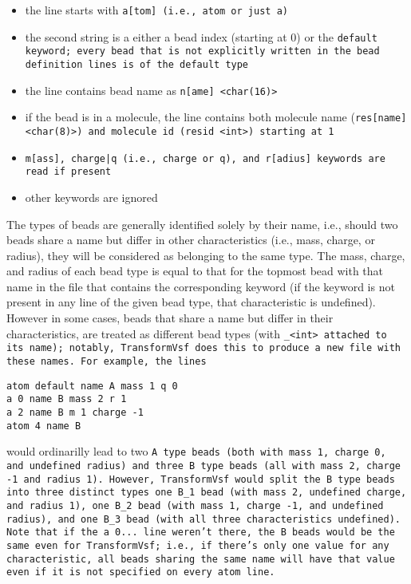 \begin{itemize}[topsep=0pt,itemsep=0pt]
  \item the line starts with \tt{a[tom]} (i.e., \tt{atom} or just \tt{a})
  \item the second string is a either a bead index (starting at 0) or the
    \tt{default} keyword; every bead that is not explicitly written in the
    bead definition lines is of the \tt{default} type
  \item the line contains bead name as \tt{n[ame] <char(16)>}
  \item if the bead is in a molecule, the line contains both molecule name
    (\tt{res[name] <char(8)>}) and molecule id (\tt{resid <int>}) starting
    at 1
  \item \tt{m[ass]}, \tt{charge|q} (i.e., \tt{charge} or \tt{q}), and
    \tt{r[adius]} keywords are read if present
  \item other keywords are ignored
\end{itemize}

The types of beads are generally identified solely by their name, i.e.,
should two beads share a name but differ in other characteristics (i.e.,
mass, charge, or radius), they will be considered as belonging to the same
type. The mass, charge, and radius of each bead type is equal to that for
the topmost bead with that name in the \vsf file that contains the
corresponding keyword (if the keyword is not present in any line of the
given bead type, that characteristic is undefined). However in some cases,
beads that share a name but differ in their characteristics, are treated as
different bead types (with \tt{\_<int>} attached to its name); notably,
\tt{TransformVsf} does this to produce a new \vsf file with these names.
For example, the lines
\begin{verbatim}
atom default name A mass 1 q 0
a 0 name B mass 2 r 1
a 2 name B m 1 charge -1
atom 4 name B
\end{verbatim}
would ordinarilly lead to two \tt{A} type beads (both with mass 1, charge
0, and undefined radius) and three \tt{B} type beads (all with mass 2,
charge -1 and radius 1). However, \tt{TransformVsf} would split the \tt{B}
type beads into three distinct types one \tt{B\_1} bead (with mass 2,
undefined charge, and radius 1), one \tt{B\_2} bead (with mass 1, charge
-1, and undefined radius), and one \tt{B\_3} bead (with all three
characteristics undefined).  Note that if the \tt{a 0...} line weren't
there, the \tt{B} beads would be the same even for \tt{TransformVsf}; i.e.,
if there's only one value for any characteristic, all beads sharing the
same name will have that value even if it is not specified on every atom
line.

